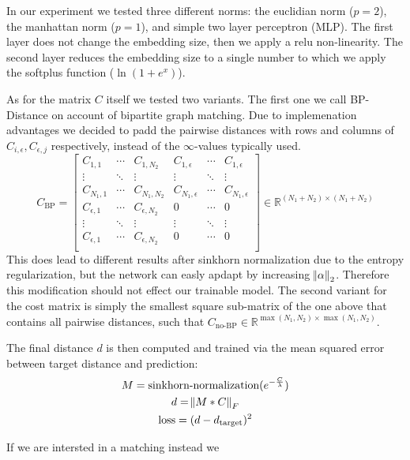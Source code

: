 In our experiment we tested three different norms: the euclidian norm ($p=2$), the manhattan norm ($p=1$), and simple two layer perceptron (MLP). The first layer does not change the embedding size, then we apply a relu non-linearity. The second layer reduces the embedding size to a single number to which we apply the softplus function ($\ln(1 + e^x)$).

As for the matrix $C$ itself we tested two variants. The first one we call BP-Distance on account of bipartite graph matching. Due to implemenation advantages we decided to padd the pairwise distances with rows and columns of $C_{i, \epsilon}, C_{\epsilon, j}$ respectively, instead of the $\infty$-values typically used.
\begin{equation}
     C_\text{BP}=
          \left[
          \begin{array}{ccc|ccc}
               C_{1,1} & \dotsi & C_{1, N_2} & C_{1, \epsilon} & \dotsi & C_{1, \epsilon} \\
               \vdots & \ddots & \vdots & \vdots & \ddots & \vdots \\
               C_{N_1, 1} & \dotsi & C_{N_1, N_2} & C_{N_1, \epsilon} & \dotsi & C_{N_1, \epsilon} \\
               \hline
               C_{\epsilon, 1} & \dotsi & C_{\epsilon, N_2} & 0 & \dotsi & 0 \\
               \vdots & \ddots & \vdots & \vdots & \ddots & \vdots \\
               C_{\epsilon, 1} & \dotsi & C_{\epsilon, N_2} & 0 & \dotsi & 0 \\
          \end{array}
          \right]
     \in \mathbb{R}^{(N_1 + N_2) \times (N_1 + N_2)}
\end{equation}
This does lead to different results after sinkhorn normalization due to the entropy regularization, but the network can easly apdapt by increasing $\norm{\alpha}_2$. Therefore this modification should not effect our trainable model. The second variant for the cost matrix is simply the smallest square sub-matrix of the one above that contains all pairwise distances, such that $C_\text{no-BP} \in \mathbb{R}^{\max({N_1, N_2}) \times \max({N_1, N_2})}$.

The final distance $d$ is then computed and trained via the mean squared error between target distance and prediction:
\begin{equation}
     \begin{gathered}
          M = \text{sinkhorn-normalization}(e^{-\frac{C}{\lambda}}) \\
          d = \norm{M * C}_F \\
          \text{loss} = (d - d_\text{target})^2
     \end{gathered}
\end{equation}

If we are intersted in a matching instead we %

